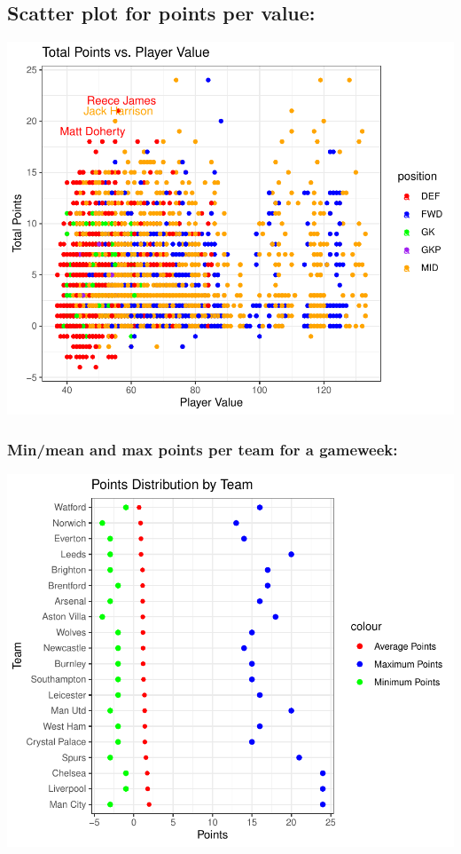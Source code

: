 \documentclass[11pt,preprint, authoryear]{elsarticle}
\numberwithin{equation}{section}
\numberwithin{figure}{section}
\numberwithin{table}{section}
\begin{document}
\hypertarget{scatter-plot-for-points-per-value}{%
\subsection{Scatter plot for points per
value:}\label{scatter-plot-for-points-per-value}}

\includegraphics{Fantasy_premier_league_team_prediction_files/figure-latex/unnamed-chunk-6-1.pdf}

\hypertarget{minmean-and-max-points-per-team-for-a-gameweek}{%
\subsubsection{Min/mean and max points per team for a
gameweek:}\label{minmean-and-max-points-per-team-for-a-gameweek}}

\includegraphics{Fantasy_premier_league_team_prediction_files/figure-latex/unnamed-chunk-7-1.pdf}
\end{document}
